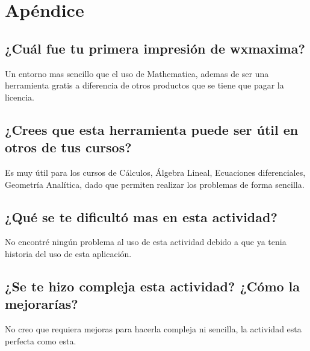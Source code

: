 \documentclass{article}
\begin{document}
\section{Apéndice}
\subsection{¿Cuál fue tu primera impresión de wxmaxima?}
Un entorno mas sencillo que el uso de Mathematica, ademas de ser una herramienta gratis a diferencia de otros productos que se tiene que pagar la licencia.
\subsection{¿Crees que esta herramienta puede ser útil en otros de tus cursos?}
Es muy útil para los cursos de Cálculos, Álgebra Lineal, Ecuaciones diferenciales, Geometría Analítica, dado que permiten realizar los problemas de forma sencilla.
\subsection{¿Qué se te dificultó mas en esta actividad?}
No encontré ningún problema al uso de esta actividad debido a que ya tenia historia del uso de esta aplicación.
\subsection{¿Se te hizo compleja esta actividad? ¿Cómo la mejorarías?}
No creo que requiera mejoras para hacerla compleja ni sencilla, la actividad esta perfecta como esta.
\end{document}
